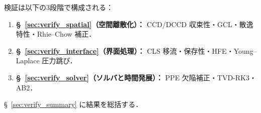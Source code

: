 検証は以下の3段階で構成される：
\begin{enumerate}
  \item \textbf{§~\ref{sec:verify_spatial}（空間離散化）：}
        CCD/DCCD 収束性・GCL・散逸特性・Rhie--Chow 補正．
  \item \textbf{§~\ref{sec:verify_interface}（界面処理）：}
        CLS 移流・保存性・HFE・Young--Laplace 圧力跳び．
  \item \textbf{§~\ref{sec:verify_solver}（ソルバと時間発展）：}
        PPE 欠陥補正・TVD-RK3・AB2．
\end{enumerate}
§~\ref{sec:verify_summary} に結果を総括する．

